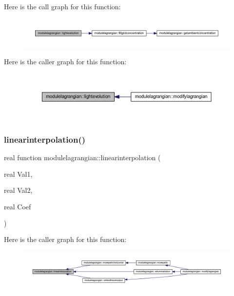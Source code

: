 Here is the call graph for this function\+:\nopagebreak
\begin{figure}[H]
\begin{center}
\leavevmode
\includegraphics[width=350pt]{namespacemodulelagrangian_aba461e3f5d94c00b11072bae66f32060_cgraph}
\end{center}
\end{figure}
Here is the caller graph for this function\+:\nopagebreak
\begin{figure}[H]
\begin{center}
\leavevmode
\includegraphics[width=350pt]{namespacemodulelagrangian_aba461e3f5d94c00b11072bae66f32060_icgraph}
\end{center}
\end{figure}
\mbox{\label{namespacemodulelagrangian_a0c6b41e19230933d9b189208e04909f1}} 
\subsubsection{\texorpdfstring{linearinterpolation()}{linearinterpolation()}}
{\footnotesize\ttfamily real function modulelagrangian\+::linearinterpolation (\begin{DoxyParamCaption}\item[{real}]{Val1,  }\item[{real}]{Val2,  }\item[{real}]{Coef }\end{DoxyParamCaption})\hspace{0.3cm}{\ttfamily [private]}}

Here is the caller graph for this function\+:\nopagebreak
\begin{figure}[H]
\begin{center}
\leavevmode
\includegraphics[width=350pt]{namespacemodulelagrangian_a0c6b41e19230933d9b189208e04909f1_icgraph}
\end{center}
\end{figure}
\mbox{\label{namespacemodulelagrangian_a42e447276e6e4455d7699fb38f9d67f0}} 
